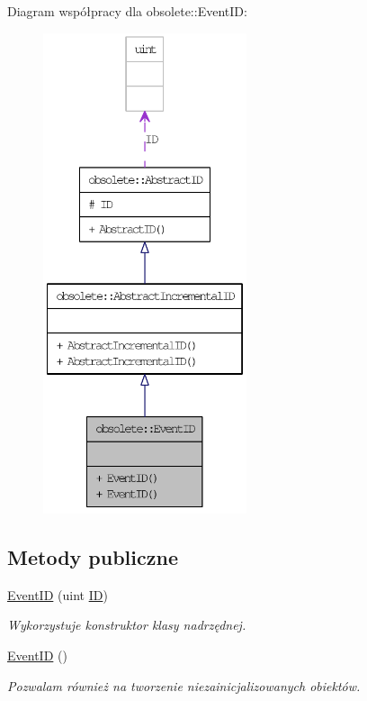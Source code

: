 Diagram współpracy dla obsolete::EventID:\nopagebreak
\begin{figure}[H]
\begin{center}
\leavevmode
\includegraphics[height=400pt]{classobsolete_1_1EventID__coll__graph}
\end{center}
\end{figure}
\subsection*{Metody publiczne}
\begin{DoxyCompactItemize}
\item 
\hyperlink{classobsolete_1_1EventID_a56f3f261f5a5a15b298795fe2663e15d}{EventID} (uint \hyperlink{classobsolete_1_1ID}{ID})
\begin{DoxyCompactList}\small\item\em Wykorzystuje konstruktor klasy nadrzędnej. \item\end{DoxyCompactList}\item 
\hyperlink{classobsolete_1_1EventID_a6de0f2cb209f8a8fe5ebe42a1bb3644d}{EventID} ()
\begin{DoxyCompactList}\small\item\em Pozwalam również na tworzenie niezainicjalizowanych obiektów. \item\end{DoxyCompactList}\end{DoxyCompactItemize}
